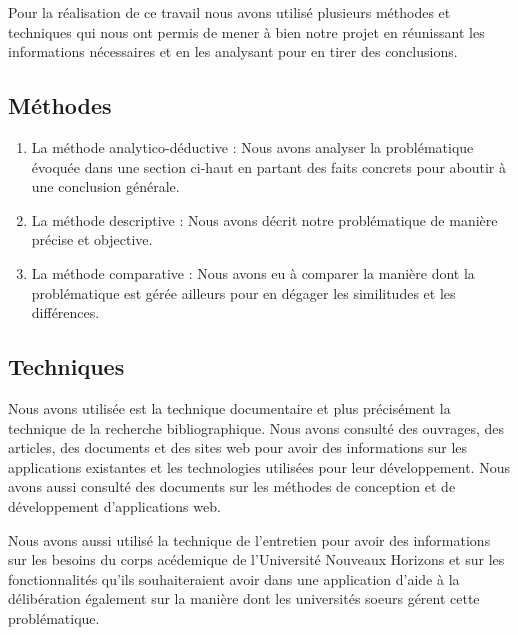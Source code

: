 Pour la réalisation de ce travail nous avons 
utilisé plusieurs méthodes et techniques qui nous ont permis de mener à bien notre projet
en réunissant les informations nécessaires et en les analysant pour en tirer des conclusions.

\subsection{Méthodes}
\begin{enumerate}
    \item La méthode analytico-déductive : Nous avons analyser la problématique évoquée dans une section ci-haut en partant des faits concrets pour aboutir à une conclusion générale.
    \item La méthode descriptive : Nous avons décrit notre problématique de manière précise et objective.
    \item La méthode comparative : Nous avons eu à comparer la manière dont la problématique est gérée ailleurs pour en dégager les similitudes et les différences.
\end{enumerate}

\newpage
\subsection{Techniques}
Nous avons utilisée est la technique documentaire et
plus précisément la technique de la recherche bibliographique. Nous avons
consulté des ouvrages, des articles, des documents et des sites web
pour avoir des informations sur les applications existantes et les
technologies utilisées pour leur développement. Nous avons aussi
consulté des documents sur les méthodes de conception et de
développement d'applications web.

Nous avons aussi utilisé la technique de l'entretien pour 
avoir des informations sur les besoins du corps acédemique de 
l'Université Nouveaux Horizons et
sur les fonctionnalités qu'ils souhaiteraient avoir 
dans une application d'aide à la délibération également sur la 
manière dont les universités soeurs gérent cette problématique.
